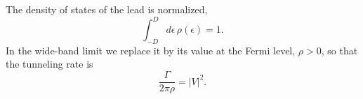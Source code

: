 \documentclass{article}
\begin{document}
The density of states of the lead is normalized,
\begin{equation}
\int_{-D}^{D} d\epsilon\, \rho(\epsilon) = 1 .
\label{eq:norm}
\end{equation}
In the wide-band limit we replace it by its value at the Fermi level, $\rho > 0$, so that
the tunneling rate is
\begin{equation}
\frac{\Gamma}{2\pi\rho} = |V|^2 .
\label{eq:gamma}
\end{equation}
\end{document}
